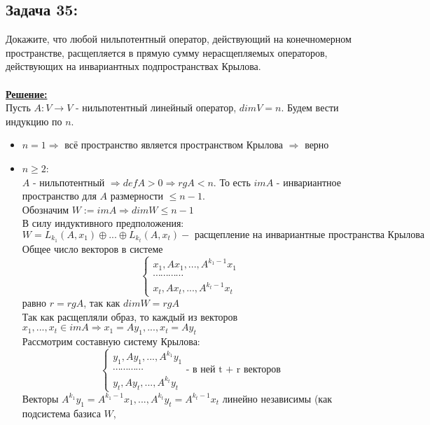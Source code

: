 \documentclass[a4paper,12pt,titlepage,final]{article}
\begin{document}
\subsection*{Задача 35:}
\noindent Докажите, что любой нильпотентный оператор, действующий на конечномерном пространстве,
расщепляется в прямую сумму нерасщепляемых операторов, действующих на инвариантных подпространствах Крылова. \\ \\
\textbf{\underline{Решение:}} \\
Пусть $A: V \rightarrow V$ - нильпотентный линейный оператор, $dimV = n$. Будем вести индукцию по $n$. 
\begin{itemize}
    \item $n = 1 \Rightarrow$ всё пространство является пространством Крылова $\Rightarrow$ верно
    \item $n \geq 2$: \\
    $A$ - нильпотентный $\Rightarrow defA > 0 \Rightarrow rgA < n$. То есть $imA$ - инвариантное пространство 
    для $A$ размерности $\leq n - 1$. \\
    Обозначим $W := imA \Rightarrow dimW \leq n - 1$ \\
    В силу индуктивного предположения:
    $$W = L_{k_1}(A, x_1) \oplus ... \oplus L_{k_t}(A, x_t) -\text{ расщепление на инвариантные пространства Крылова}$$
    Общее число векторов в системе 
    $$
    \begin{cases}
        x_1, Ax_1, ... , A^{k_1 - 1} x_1 \\
        \cdots \cdots \cdots \cdots \\
        x_t , Ax_t, ... , A^{k_t - 1} x_t
    \end{cases}
    $$
    равно $r = rgA$, так как $dimW = rgA$ \\
    Так как расщепляли образ, то каждый из векторов $x_1, ... , x_t \in imA \Rightarrow x_1 = Ay_1, ... , x_t = Ay_t$ \\
    Рассмотрим составную систему Крылова:
    $$
    \begin{cases}
        y_1, Ay_1, ... , A^{k_1} y_1 \\
        \cdots \cdots \cdots \cdots \\
        y_t , Ay_t, ... , A^{k_t} y_t
    \end{cases}
    \text{- в ней t + r векторов}
    $$
    Векторы $A^{k_1}y_1 = A^{k_1 - 1}x_1, ... , A^{k_t}y_t = A^{k_t - 1}x_t$ линейно независимы (как подсистема базиса $W$, 

\end{itemize}
\end{document}
